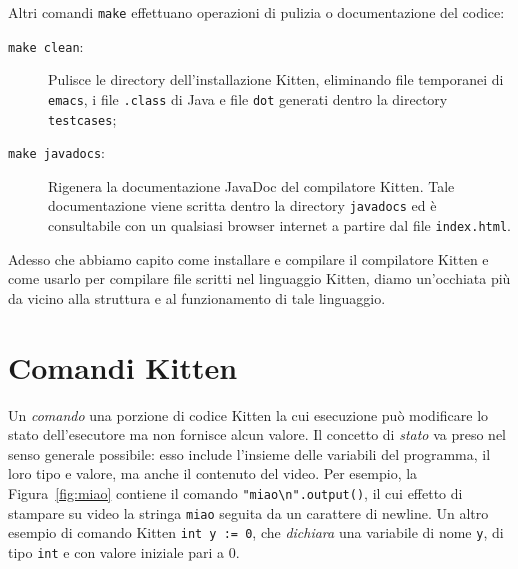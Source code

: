 Altri comandi \texttt{make} effettuano operazioni
di pulizia o documentazione del codice:
%
\begin{description}
\item[\texttt{make clean}:]
  Pulisce le directory dell'installazione Kitten, eliminando file temporanei
  di \texttt{emacs}, i file \texttt{.class} di Java e file \texttt{dot}
  generati dentro la directory \texttt{testcases};
\item[\texttt{make javadocs}:]
  Rigenera la documentazione JavaDoc del compilatore Kitten.
  Tale documentazione viene scritta dentro la directory
  \texttt{javadocs} ed \`e consultabile con un qualsiasi browser
  internet a partire dal file \texttt{index.html}.
\end{description}
%

Adesso che abbiamo capito come installare e compilare il compilatore
Kitten e come usarlo per compilare file scritti nel linguaggio Kitten,
diamo un'occhiata pi\`u da vicino alla struttura e al funzionamento di
tale linguaggio.
%
\section{Comandi Kitten}\label{sec:commands}
%
Un \emph{comando} \e una porzione di codice Kitten la cui esecuzione
pu\`o modificare lo stato dell'esecutore ma non fornisce alcun valore.
Il concetto di \emph{stato} va preso nel senso \piu
generale possibile: esso include l'insieme delle variabili del programma,
il loro tipo e valore, ma anche il contenuto del video.
Per esempio, la Figura~\ref{fig:miao} contiene il
comando \verb|"miao\n".output()|, il cui effetto \e di stampare su video
la stringa \texttt{miao} seguita da un carattere di newline.
Un altro esempio di comando Kitten \e \verb|int y := 0|, che \emph{dichiara}
una variabile di nome \texttt{y}, di tipo \texttt{int} e con valore iniziale
pari a $0$.

